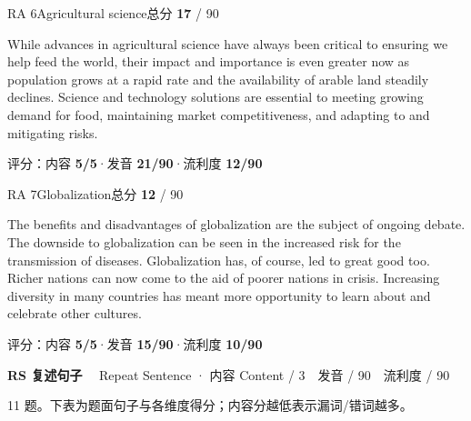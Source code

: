 \documentclass[11pt]{article}
\newcommand{\sfull}[1]{\textcolor{cFix}{\bfseries #1}}     %
\newcommand{\spart}[1]{\textcolor{cPartial}{\bfseries #1}} %
\newcommand{\szero}[1]{\textcolor{cWrong}{\bfseries #1}}   %
\newcommand{\ptetask}[2]{%
  \needspace{4\baselineskip}\medskip
  \begin{tcolorbox}[enhanced, colback=cHead, colframe=cHead, sharp corners,
     left=12pt, right=12pt, top=5pt, bottom=5pt, boxrule=0pt]
    {\large\bfseries\color{white} #1}\ \ {\color{white!80} #2}
  \end{tcolorbox}\smallskip}
\begin{document}
\begin{qblock}{RA 6\quad Agricultural science}{总分 \textcolor{cAccent}{\bfseries 17} / 90}
\begin{promptbox}
While advances in agricultural science have always been critical to ensuring we help feed the world, their impact and importance is even greater now as population grows at a rapid rate and the availability of arable land steadily declines. Science and technology solutions are essential to meeting growing demand for food, maintaining market competitiveness, and adapting to and mitigating risks.
\end{promptbox}
{\small 评分：内容 \sfull{5/5}\quad·\quad 发音 \spart{21/90}\quad·\quad 流利度 \szero{12/90}}
\end{qblock}

\begin{qblock}{RA 7\quad Globalization}{总分 \textcolor{cAccent}{\bfseries 12} / 90}
\begin{promptbox}
The benefits and disadvantages of globalization are the subject of ongoing debate. The downside to globalization can be seen in the increased risk for the transmission of diseases. Globalization has, of course, led to great good too. Richer nations can now come to the aid of poorer nations in crisis. Increasing diversity in many countries has meant more opportunity to learn about and celebrate other cultures.
\end{promptbox}
{\small 评分：内容 \sfull{5/5}\quad·\quad 发音 \spart{15/90}\quad·\quad 流利度 \szero{10/90}}
\end{qblock}

\ptetask{RS 复述句子}{Repeat Sentence · 内容 Content / 3　发音 / 90　流利度 / 90}

{\small\color{gray} 11 题。下表为题面句子与各维度得分；内容分越低表示漏词/错词越多。}\smallskip
\end{document}
